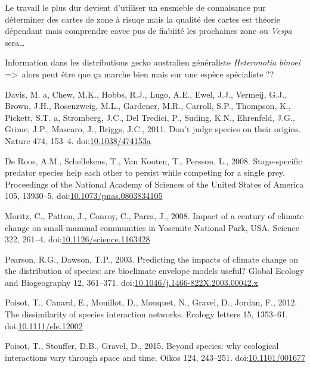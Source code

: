 Le travail le plus dur devient d'utiliser un ensmeble de connaisance pur
déterminer des cartes de zone à risuqe mais la qualité des cartes est
théorie dépendant mais comprendre eavce pus de fiabiité les prochaines
zone ou \emph{Vespa} sera\ldots{}

Information dans les distributions gecko australien généraliste
\emph{Heteronotia binoei} =\textgreater{}~alors peut être que ça marche
bien mais sur une espèce spécialiste ??

\hypertarget{refs}{}
\hypertarget{ref-Davis2011}{}
Davis, M. a, Chew, M.K., Hobbs, R.J., Lugo, A.E., Ewel, J.J., Vermeij,
G.J., Brown, J.H., Rosenzweig, M.L., Gardener, M.R., Carroll, S.P.,
Thompson, K., Pickett, S.T. a, Stromberg, J.C., Del Tredici, P., Suding,
K.N., Ehrenfeld, J.G., Grime, J.P., Mascaro, J., Briggs, J.C., 2011.
Don't judge species on their origins. Nature 474, 153--4.
doi:\href{https://doi.org/10.1038/474153a}{10.1038/474153a}

\hypertarget{ref-DeRoos2008}{}
De Roos, A.M., Schellekens, T., Van Kooten, T., Persson, L., 2008.
Stage-specific predator species help each other to persist while
competing for a single prey. Proceedings of the National Academy of
Sciences of the United States of America 105, 13930--5.
doi:\href{https://doi.org/10.1073/pnas.0803834105}{10.1073/pnas.0803834105}

\hypertarget{ref-Moritz2008}{}
Moritz, C., Patton, J., Conroy, C., Parra, J., 2008. Impact of a century
of climate change on small-mammal communities in Yosemite National Park,
USA. Science 322, 261--4.
doi:\href{https://doi.org/10.1126/science.1163428}{10.1126/science.1163428}

\hypertarget{ref-Pearson2003}{}
Pearson, R.G., Dawson, T.P., 2003. Predicting the impacts of climate
change on the distribution of species: are bioclimate envelope models
useful? Global Ecology and Biogeography 12, 361--371.
doi:\href{https://doi.org/10.1046/j.1466-822X.2003.00042.x}{10.1046/j.1466-822X.2003.00042.x}

\hypertarget{ref-Poisot2012}{}
Poisot, T., Canard, E., Mouillot, D., Mouquet, N., Gravel, D., Jordan,
F., 2012. The dissimilarity of species interaction networks. Ecology
letters 15, 1353--61.
doi:\href{https://doi.org/10.1111/ele.12002}{10.1111/ele.12002}

\hypertarget{ref-Poisot2015}{}
Poisot, T., Stouffer, D.B., Gravel, D., 2015. Beyond species: why
ecological interactions vary through space and time. Oikos 124,
243--251. doi:\href{https://doi.org/10.1101/001677}{10.1101/001677}

